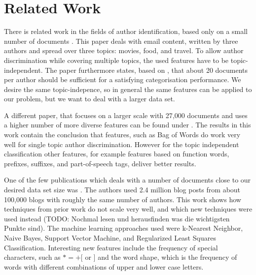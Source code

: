 
\section{Related Work}
\label{sec:related}


There is related work in the fields of author identification, based only on a small number of documents \cite{de2001mining}.
This paper deals with email content, written by three authors and spread over three topics: movies, food, and travel.
To allow author discrimination while covering multiple topics, the used features have to be topic-independent.
The paper furthermore states, based on \cite{corney2001identifying}, that about 20 documents per author should be sufficient for a satisfying categorisation performance.
We desire the same topic-indepence, so in general the same features can be applied to our problem, but we want to deal with a larger data set.


A different paper, that focuses on a larger scale with 27,000 documents and uses a higher number of more diverse features can be found under \cite{madigan2005author}.
The results in this work contain the conclusion that features, such as Bag of Words do work very well for single topic author discrimination.
However for the topic independent classification other features, for example features based on function words, prefixes, suffixes, and part-of-speech tags, deliver better results. 

One of the few publications which deals with a number of documents close to our desired data set size was \cite{narayanan2012feasibility}.
The authors used 2.4 million blog posts from about 100,000 blogs with roughly the same number of authors.
This work shows how techniques from prior work do not scale very well, and which new techniques were used instead (TODO: Nochmal lesen und herausfinden was die wichtigsten Punkte sind).
The machine learning approaches used were k-Nearest Neighbor, Naive Bayes, Support Vector Machine, and Regularized Least Squares Classification.
Interesting new features include the frequency of special characters, such as $*=+[$ or $]$ and the word shape, which is the frequency of words with different combinations of upper and lower case letters.